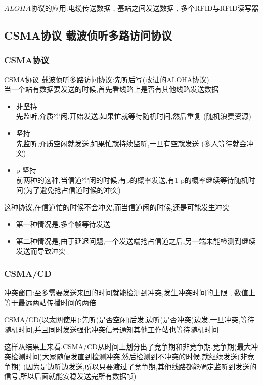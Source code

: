 \documentclass[UTF8,a4paper]{ctexart}
\begin{document}
$ALOHA$协议的应用:电缆传送数据 , 基站之间发送数据 , 多个RFID与RFID读写器

\subsection{CSMA协议 载波侦听多路访问协议}
\subsubsection{CSMA协议}

CSMA协议 载波侦听多路访问协议:先听后写(改进的ALOHA协议)\\
当一个站有数据要发送的时候,首先看线路上是否有其他线路发送数据
\begin{itemize}
  \item 非坚持\\
  先监听,介质空闲,开始发送,如果忙就等待随机时间,然后重复
  (随机浪费资源)
  \item 坚持\\
  先监听,介质空闲就发送,如果忙就持续监听,一旦有空就发送
  (多人等待就会冲突)
  \item p-坚持\\
  前两种的这种,当信道空闲的时候,有p的概率发送,有1-p的概率继续等待随机时间(为了避免抢占信道时候的冲突)
\end{itemize}

这种协议,在信道忙的时候不会冲突,而当信道闲的时候,还是可能发生冲突
\begin{itemize}
  \item 第一种情况是,多个帧等待发送
  \item 第二种情况是,由于延迟问题,一个发送端抢占信道之后,另一端未能检测到继续发送而导致冲突
\end{itemize}


\subsubsection{CSMA/CD}

冲突窗口:至多需要发送来回的时间就能检测到冲突,发生冲突时间的上限 , 数值上等于最远两站传播时间的两倍

CSMA/CD(以太网使用):先听(是否空闲)后发,边听(是否冲突)边发,一旦冲突,等待随机时间,并且同时发送强化冲突信号通知其他工作站也等待随机时间

这样从结果上来看,CSMA/CD从时间上划分出了竞争期和非竞争期,竞争期(最大冲突检测时间)大家随便发直到检测冲突,然后检测到不冲突的时候,就继续发送(非竞争期)
(因为是边听边发送,所以只要渡过了竞争期,其他线路都能确定监听到发送的信号,所以后面就能安稳发送完所有数据帧)
\end{document}
